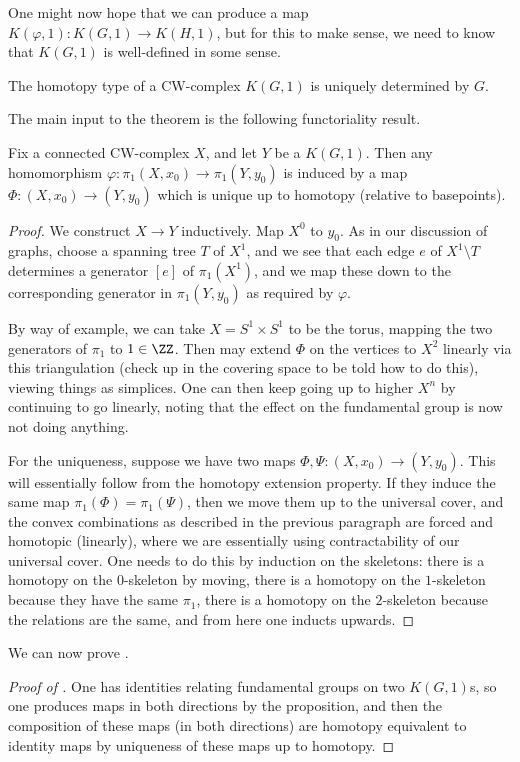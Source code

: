 \documentclass[../notes.tex]{subfiles}
\begin{document}
One might now hope that we can produce a map $K(\varphi,1)\colon K(G,1)\to K(H,1)$, but for this to make sense, we need to know that $K(G,1)$ is well-defined in some sense.
\begin{theorem} \label{thm:k-g-1-uniq-homotopy}
	The homotopy type of a CW-complex $K(G,1)$ is uniquely determined by $G$.
\end{theorem}
The main input to the theorem is the following functoriality result.
\begin{proposition} \label{prop:k-g-1-up}
	Fix a connected CW-complex $X$, and let $Y$ be a $K(G,1)$. Then any homomorphism $\varphi\colon\pi_1(X,x_0)\to\pi_1(Y,y_0)$ is induced by a map $\Phi\colon(X,x_0)\to(Y,y_0)$ which is unique up to homotopy (relative to basepoints).
\end{proposition}
\begin{proof}
	We construct $X\to Y$ inductively. Map $X^0$ to $y_0$. As in our discussion of graphs, choose a spanning tree $T$ of $X^1$, and we see that each edge $e$ of $X^{1}\setminus T$ determines a generator $[e]$ of $\pi_1(X^1)$, and we map these down to the corresponding generator in $\pi_1(Y,y_0)$ as required by $\varphi$.

	By way of example, we can take $X=S^1\times S^1$ to be the torus, mapping the two generators of $\pi_1$ to $1\in\ZZ$. Then may extend $\Phi$ on the vertices to $X^2$ linearly via this triangulation (check up in the covering space to be told how to do this), viewing things as simplices. One can then keep going up to higher $X^n$ by continuing to go linearly, noting that the effect on the fundamental group is now not doing anything.

	For the uniqueness, suppose we have two maps $\Phi,\Psi\colon(X,x_0)\to(Y,y_0)$. This will essentially follow from the homotopy extension property. If they induce the same map $\pi_1(\Phi)=\pi_1(\Psi)$, then we move them up to the universal cover, and the convex combinations as described in the previous paragraph are forced and homotopic (linearly), where we are essentially using contractability of our universal cover. One needs to do this by induction on the skeletons: there is a homotopy on the $0$-skeleton by moving, there is a homotopy on the $1$-skeleton because they have the same $\pi_1$, there is a homotopy on the $2$-skeleton because the relations are the same, and from here one inducts upwards.
\end{proof}
We can now prove .
\begin{proof}[Proof of ]
	One has identities relating fundamental groups on two $K(G,1)$s, so one produces maps in both directions by the proposition, and then the composition of these maps (in both directions) are homotopy equivalent to identity maps by uniqueness of these maps up to homotopy.
\end{proof}
\end{document}
